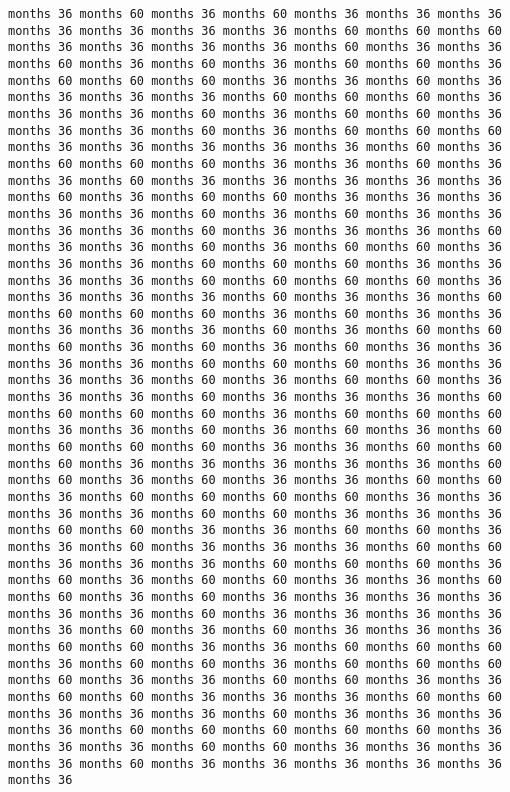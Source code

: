\documentclass[11pt]{article}
\begin{document}
\begin{Verbatim}[commandchars=\\\{\}, frame=single, framerule=2mm, rulecolor=\color{outerrorbackground}]
months 36 months 60 months 36 months 60 months 36 months 36 months 36 months 36 months 36 months 36 months 36 months 60 months 60 months 60 months 36 months 36 months 36 months 36 months 60 months 36 months 36 months 60 months 36 months 60 months 36 months 60 months 60 months 36 months 60 months 60 months 60 months 36 months 36 months 60 months 36 months 36 months 36 months 36 months 60 months 60 months 60 months 36 months 36 months 36 months 60 months 36 months 60 months 60 months 36 months 36 months 36 months 60 months 36 months 60 months 60 months 60 months 36 months 36 months 36 months 36 months 36 months 60 months 36 months 60 months 60 months 60 months 36 months 36 months 60 months 36 months 36 months 60 months 36 months 36 months 36 months 36 months 36 months 60 months 36 months 60 months 60 months 36 months 36 months 36 months 36 months 36 months 60 months 36 months 60 months 36 months 36 months 36 months 36 months 60 months 36 months 36 months 36 months 60 months 36 months 36 months 60 months 36 months 60 months 60 months 36 months 36 months 36 months 60 months 60 months 60 months 36 months 36 months 36 months 36 months 60 months 60 months 60 months 60 months 36 months 36 months 36 months 36 months 60 months 36 months 36 months 60 months 60 months 60 months 60 months 36 months 60 months 36 months 36 months 36 months 36 months 36 months 60 months 36 months 60 months 60 months 60 months 36 months 60 months 36 months 60 months 36 months 36 months 36 months 36 months 60 months 60 months 60 months 36 months 36 months 36 months 36 months 60 months 36 months 60 months 60 months 36 months 36 months 36 months 60 months 36 months 36 months 36 months 60 months 60 months 60 months 60 months 36 months 60 months 60 months 60 months 36 months 36 months 60 months 36 months 60 months 36 months 60 months 60 months 60 months 60 months 36 months 36 months 60 months 60 months 60 months 36 months 36 months 36 months 36 months 36 months 60 months 60 months 36 months 60 months 36 months 36 months 60 months 60 months 36 months 60 months 60 months 60 months 60 months 36 months 36 months 36 months 36 months 60 months 60 months 36 months 36 months 36 months 60 months 60 months 36 months 36 months 60 months 60 months 36 months 36 months 60 months 36 months 36 months 36 months 60 months 60 months 36 months 36 months 36 months 60 months 60 months 60 months 36 months 60 months 36 months 60 months 60 months 36 months 36 months 60 months 60 months 36 months 60 months 36 months 36 months 36 months 36 months 36 months 36 months 60 months 36 months 36 months 36 months 36 months 36 months 60 months 36 months 60 months 36 months 36 months 36 months 60 months 60 months 36 months 36 months 60 months 60 months 60 months 36 months 60 months 60 months 36 months 60 months 60 months 60 months 60 months 36 months 36 months 60 months 60 months 36 months 36 months 60 months 60 months 36 months 36 months 36 months 60 months 60 months 36 months 36 months 36 months 60 months 36 months 36 months 36 months 36 months 60 months 60 months 60 months 60 months 60 months 36 months 36 months 36 months 60 months 60 months 36 months 36 months 36 months 36 months 60 months 36 months 36 months 36 months 36 months 36 months 36 
\end{Verbatim}
\end{document}
